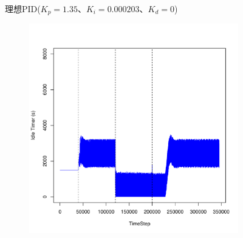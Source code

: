 \documentclass[a4j]{ujarticle}
\begin{document}
\begin{figure}[htbp]
\begin{subfigure}{0.49\hsize}
   \label{subfig:scenario_7_stateBreakdown_0_691200_1-35_0-000203_0_0_shortFrequency_addIn100s_random}
 \end{subfigure}
 \caption{理想PID($K_p = 1.35、K_i = 0.000203、K_d = 0$)}
 \label{fig:result_pi_scenario7_shortFrequency_addIn100s_random}
\end{figure}
\clearpage

\begin{figure}[htbp]
 \centering
 \begin{subfigure}{0.49\hsize}
   \centering
   \includegraphics[width=1.0\hsize]{scenario_7_idleTimer_0_691200_1-8_0-00045_1800_0_shortFrequency_addIn100s_random.pdf}
   \label{subfig:scenario_7_idleTimer_0_691200_1-8_0-00045_1800_0_shortFrequency_addIn100s_random}
 \end{subfigure}
 \par\bigskip %
 \begin{subfigure}{0.49\hsize}

\end{subfigure}
\end{figure}
\end{document}
